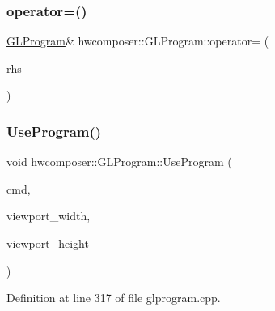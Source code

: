 \subsubsection{\texorpdfstring{operator=()}{operator=()}}
{\footnotesize\ttfamily \mbox{\hyperlink{classhwcomposer_1_1GLProgram}{G\+L\+Program}}\& hwcomposer\+::\+G\+L\+Program\+::operator= (\begin{DoxyParamCaption}\item[{const \mbox{\hyperlink{classhwcomposer_1_1GLProgram}{G\+L\+Program}} \&}]{rhs }\end{DoxyParamCaption})\hspace{0.3cm}{\ttfamily [delete]}}

\mbox{\label{classhwcomposer_1_1GLProgram_a59b867819bd92a020986adf4da964892}} 
\subsubsection{\texorpdfstring{Use\+Program()}{UseProgram()}}
{\footnotesize\ttfamily void hwcomposer\+::\+G\+L\+Program\+::\+Use\+Program (\begin{DoxyParamCaption}\item[{const \mbox{\hyperlink{structhwcomposer_1_1RenderState}{Render\+State}} \&}]{cmd,  }\item[{G\+Luint}]{viewport\+\_\+width,  }\item[{G\+Luint}]{viewport\+\_\+height }\end{DoxyParamCaption})}



Definition at line 317 of file glprogram.\+cpp.


